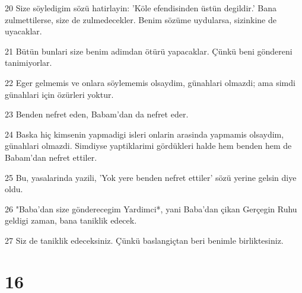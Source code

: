 \par 20 Size söyledigim sözü hatirlayin: 'Köle efendisinden üstün degildir.' Bana zulmettilerse, size de zulmedecekler. Benim sözüme uydularsa, sizinkine de uyacaklar.
\par 21 Bütün bunlari size benim adimdan ötürü yapacaklar. Çünkü beni göndereni tanimiyorlar.
\par 22 Eger gelmemis ve onlara söylememis olsaydim, günahlari olmazdi; ama simdi günahlari için özürleri yoktur.
\par 23 Benden nefret eden, Babam'dan da nefret eder.
\par 24 Baska hiç kimsenin yapmadigi isleri onlarin arasinda yapmamis olsaydim, günahlari olmazdi. Simdiyse yaptiklarimi gördükleri halde hem benden hem de Babam'dan nefret ettiler.
\par 25 Bu, yasalarinda yazili, 'Yok yere benden nefret ettiler' sözü yerine gelsin diye oldu.
\par 26 "Baba'dan size gönderecegim Yardimci*, yani Baba'dan çikan Gerçegin Ruhu geldigi zaman, bana taniklik edecek.
\par 27 Siz de taniklik edeceksiniz. Çünkü baslangiçtan beri benimle birliktesiniz.

\chapter{16}

